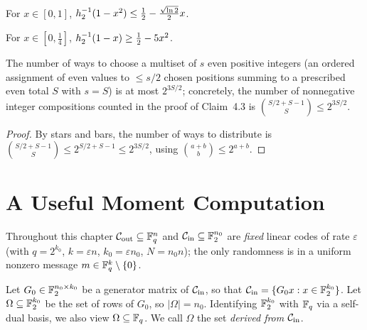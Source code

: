 \begin{lemma}
  \label{lem:h2-inv-upper}
  \notready
  For $x \in [0,1]$, $h_2^{-1}(1 - x^2) \leq \frac12 - \frac{\sqrt{\ln 2}}{2}x$.
\end{lemma}

\begin{lemma}
  \label{lem:h2-inv-lower}
  \notready
  For $x \in [0,\tfrac14]$, $h_2^{-1}(1 - x) \geq \frac12 - 5x^2$.
\end{lemma}

\begin{lemma}
  \label{lem:stars-bars}
  The number of ways to choose a multiset of $s$ even positive integers (an
  ordered assignment of even values to $\leq s/2$ chosen positions summing to a
  prescribed even total $S$ with $s = S$) is at most $2^{3S/2}$; concretely, the
  number of nonnegative integer compositions counted in the proof of Claim~4.3 is
  $\binom{S/2 + S - 1}{S} \leq 2^{3S/2}$.
\end{lemma}
\begin{proof}
  By stars and bars, the number of ways to distribute is
  $\binom{S/2 + S - 1}{S} \leq 2^{S/2 + S - 1}\leq 2^{3S/2}$, using
  $\binom{a+b}{b}\leq 2^{a+b}$.
\end{proof}

\chapter{A Useful Moment Computation}
\label{chap:moment}

Throughout this chapter $\mathcal{C}_{\mathrm{out}} \subseteq \mathbb{F}_q^n$ and $\mathcal{C}_{\mathrm{in}} \subseteq \mathbb{F}_2^{n_0}$
are \emph{fixed} linear codes of rate $\varepsilon$ (with $q = 2^{k_0}$,
$k = \varepsilon n$, $k_0 = \varepsilon n_0$, $N = n_0 n$); the only randomness is
in a uniform nonzero message $m \in \mathbb{F}_q^k \setminus \{0\}$.

\begin{definition}
  \label{def:omega}
  Let $G_0 \in \mathbb{F}_2^{n_0 \times k_0}$ be a generator matrix of $\mathcal{C}_{\mathrm{in}}$, so that
  $\mathcal{C}_{\mathrm{in}} = \{G_0 x : x \in \mathbb{F}_2^{k_0}\}$. Let $\Omega \subseteq \mathbb{F}_2^{k_0}$ be
  the set of rows of $G_0$, so $|\Omega| = n_0$. Identifying $\mathbb{F}_2^{k_0}$ with
  $\mathbb{F}_q$ via a self-dual basis, we also view $\Omega \subseteq \mathbb{F}_q$. We call
  $\Omega$ the set \emph{derived from} $\mathcal{C}_{\mathrm{in}}$.
\end{definition}

